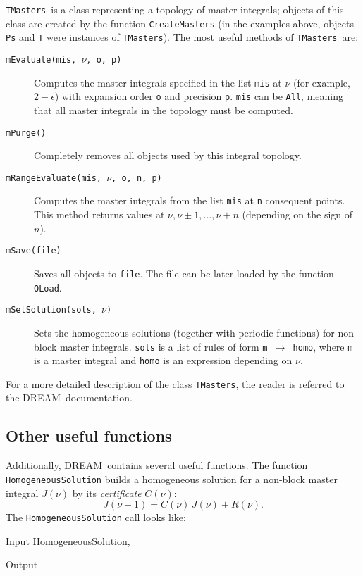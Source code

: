 \documentclass[sort&compress]{elsarticle}
\newcommand{\TMasters}{\texttt{TMasters}}
\begin{document}
\TMasters\ is a class representing a topology of master integrals; 
objects of this class are created by the function \texttt{CreateMasters} (in the examples above, objects \texttt{Ps} and \texttt{T} were instances of \TMasters).
The most useful methods of \TMasters\ are:
\begin{description}
	\item[\texttt{mEvaluate(mis, $\nu$, o, p)}]
		Computes the master integrals specified in the list \texttt{mis} at $\nu$ (for example, $2-\epsilon$) with expansion order \texttt{o} and precision \texttt{p}.
		\texttt{mis} can be \texttt{All}, meaning that all master integrals in the topology must be computed.

	\item[\texttt{mPurge()}]
		Completely removes all objects used by this integral topology.

	\item[\texttt{mRangeEvaluate(mis, $\nu$, o, n, p)}]
		Computes the master integrals from the list \texttt{mis} at \texttt{n} consequent points.
		This method returns values at $\nu, \nu\pm1, \ldots, \nu+n$ (depending on the sign of $n$).

	\item[\texttt{mSave(file)}]
		Saves all objects to \texttt{file}.
		The file can be later loaded by the function \texttt{OLoad}.

	\item[\texttt{mSetSolution(sols, $\nu$)}]
		Sets the homogeneous solutions (together with periodic functions) for non-block master integrals.
		\texttt{sols} is a list of rules of form \texttt{m $\to$ homo}, where \texttt{m} is a master integral and \texttt{homo} is an expression depending on $\nu$.
\end{description}
For a more detailed description of the class \TMasters, the reader is referred to the DREAM\ documentation.

\subsection{Other useful functions}

Additionally, DREAM\ contains several useful functions.
The function \texttt{HomogeneousSolution} builds a homogeneous solution for a non-block master integral $J(\nu)$ by its \emph{certificate} $C(\nu)$:
\begin{equation}
	J(\nu+1) = C(\nu) \, J(\nu) + R(\nu).
\end{equation}
The \texttt{HomogeneousSolution} call looks like:
\begin{mmaCell}[moredefined={HomogeneousSolution}]{Input}
	HomogeneousSolution\pbl{}, \mmaUnd{\(\nu\)}\pbr
\end{mmaCell}
\begin{mmaCell}{Output}
\end{mmaCell}
\end{document}
